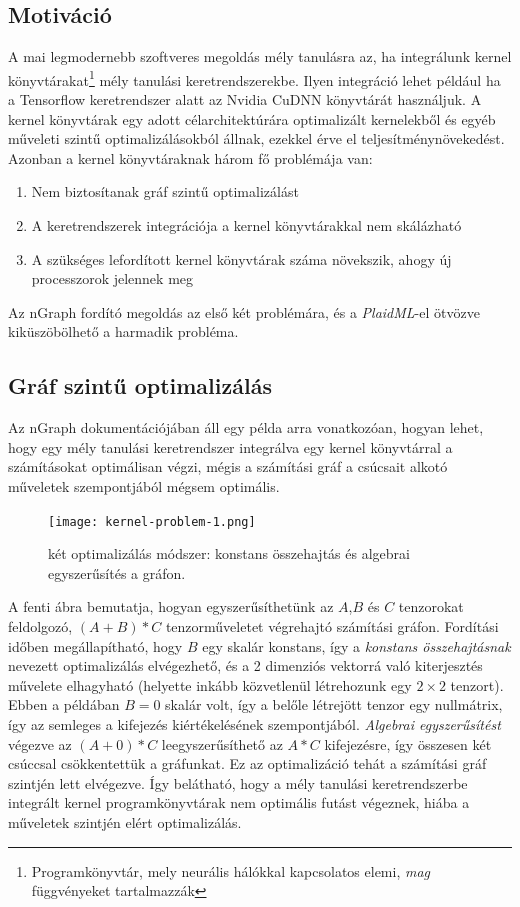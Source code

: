 \subsection{Motiváció}
A mai legmodernebb szoftveres megoldás mély tanulásra az, ha integrálunk kernel könyvtárakat\footnote{Programkönyvtár, mely neurális hálókkal kapcsolatos elemi, \emph{mag} függvényeket tartalmazzák} mély tanulási keretrendszerekbe.
Ilyen integráció lehet például ha a Tensorflow keretrendszer alatt az Nvidia CuDNN könyvtárát használjuk.
A {kernel könyvtárak} egy adott célarchitektúrára optimalizált kernelekből és egyéb műveleti szintű optimalizálásokból állnak, ezekkel érve el teljesítménynövekedést.
Azonban a kernel könyvtáraknak három fő problémája van:
\begin{enumerate}
	\item Nem biztosítanak gráf szintű optimalizálást
	\item A keretrendszerek integrációja a {kernel könyvtárakkal} nem skálázható
	\item A szükséges lefordított kernel könyvtárak száma növekszik, ahogy új processzorok jelennek meg
\end{enumerate}
Az nGraph fordító megoldás az első két problémára, és a \emph{PlaidML}-el ötvözve kiküszöbölhető a harmadik probléma.
\subsection{Gráf szintű optimalizálás}
Az nGraph dokumentációjában áll egy példa arra vonatkozóan, hogyan lehet, hogy egy mély tanulási keretrendszer integrálva egy {kernel könyvtárral} a számításokat optimálisan végzi, mégis a számítási gráf a csúcsait alkotó műveletek szempontjából mégsem optimális.
\begin{figure}[!ht]
	\centering
	\texttt{[image: kernel-problem-1.png]}
	\caption{két optimalizálás módszer: konstans összehajtás és algebrai egyszerűsítés a gráfon. \protect \footnotemark}
	\label{fig:grafoptimalizalas}
\end{figure}
A fenti ábra bemutatja, hogyan egyszerűsíthetünk az $A$,$B$ és $C$ tenzorokat feldolgozó, $ (A+B)*C $ tenzorműveletet végrehajtó számítási gráfon.
Fordítási időben megállapítható, hogy $B$ egy skalár konstans, így a \emph{konstans összehajtásnak} nevezett optimalizálás elvégezhető, és a 2 dimenziós vektorrá való kiterjesztés művelete elhagyható (helyette inkább közvetlenül létrehozunk egy $2\times2$ tenzort).
Ebben a példában $B=0$ skalár volt, így a belőle létrejött tenzor egy nullmátrix, így az semleges a kifejezés kiértékelésének szempontjából.
\emph{Algebrai egyszerűsítést} végezve az $ (A+0)*C $ leegyszerűsíthető az $A*C$ kifejezésre, így összesen két csúccsal csökkentettük a gráfunkat.
Ez az optimalizáció tehát a számítási gráf szintjén lett elvégezve.
Így belátható, hogy a mély tanulási keretrendszerbe integrált kernel programkönyvtárak nem optimális futást végeznek, hiába a műveletek szintjén elért optimalizálás. 
